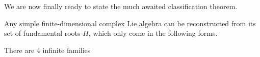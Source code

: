 We are now finally ready to state the much awaited classification theorem.
\begin{theorem}
Any simple finite-dimensional complex Lie algebra can be reconstructed from its set of fundamental roots $\Pi$, which only come in the following forms. 
\ben[label=\roman*)]
\item There are $4$ infinite families


\end{theorem}

